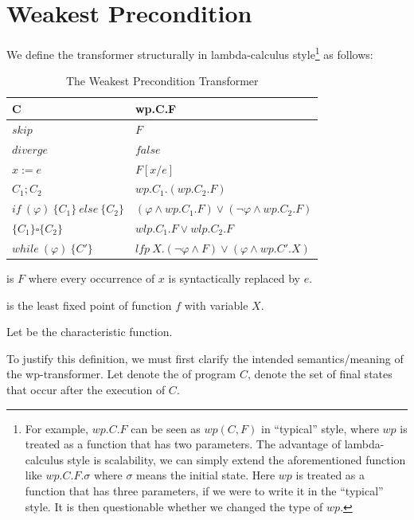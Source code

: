 \section{Weakest Precondition}
We define the  transformer structurally in lambda-calculus style\footnote{For example, $wp.C.F$ can be seen as $wp(C,F)$ in ``typical'' style, where $wp$ is treated as a function that has two parameters. The advantage of lambda-calculus style is scalability, we can simply extend the aforementioned function like $wp.C.F.\sigma$ where $\sigma$ means the initial state. Here $wp$ is treated as a function that has three parameters, if we were to write it in the ``typical'' style. It is then questionable whether we changed the type of $wp$. } as follows: 

\begin{table}[h!]\centering
    \begin{tabular}{ll}
      \textbf{C}&\textbf{wp.C.F}    \\ \hline
      $skip$&   $F$   \\
      $diverge$&  $false$\\
      $x:= e $&  $F[x/e]$\\
      $C_1;C_2$&  $wp.C_1.(wp.C_2.F)$\\
      $if\ (\varphi)\ \{C_1\}\ else\ \{C_2\} $&  $(\varphi\wedge wp.C_1.F)\vee(\neg\varphi\wedge wp.C_2.F)$\\
      $\{C_1\}\square \{C_2\}$ & $wlp.C_1.F\vee wlp.C_2.F$ \\
      $while\ (\varphi)\ \{C'\}$&  $lfp\ X.(\neg\varphi\wedge F)\vee(\varphi\wedge wp.C'.X)$\\
    \end{tabular}
    \caption{The Weakest Precondition Transformer}
\end{table}

 is $F$ where every occurrence of $x$ is syntactically replaced by $e$. 

 is the least fixed point of function $f$ with variable $X$. 

Let  be the characteristic function. 

To justify this definition, we must first clarify the intended semantics/meaning of the wp-transformer. 
Let  denote the  of program $C$,  denote the set of final states that  occur after the execution of $C$. 

